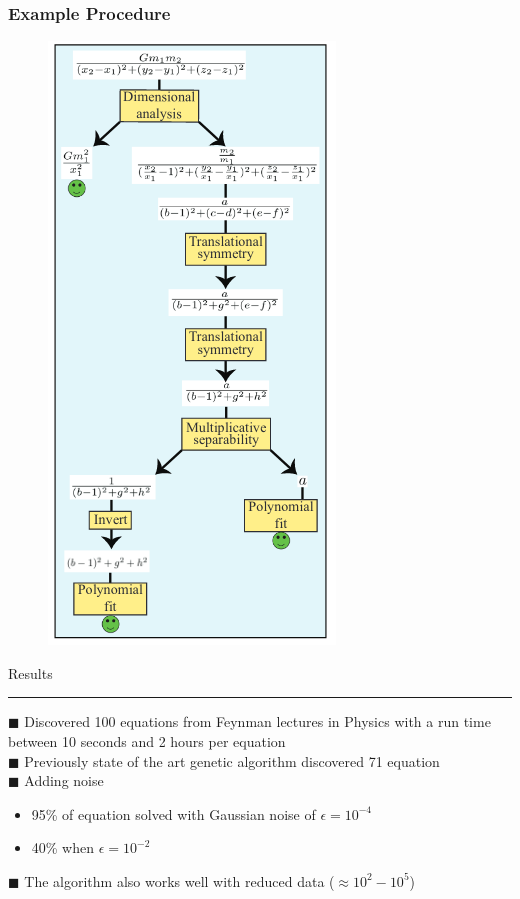 \documentclass[c,compress]{beamer}
\def\bsq{\color{blue(pigment)} $\blacksquare$ \color{black}}
\begin{document}
\begin{frame}\frametitle{Example Procedure}
\label{eg}
\begin{figure}
    \centering
    \includegraphics[height=0.8\textheight,keepaspectratio]{example_scheme.png}
\end{figure}
 

\end{frame}

\begin{frame}{Results\\\rule{10.5cm}{0.5pt}} \label{Method}

\bsq Discovered 100 equations from Feynman lectures in Physics with a run time between 10 seconds and 2 hours per equation\\
\bsq Previously state of the art genetic algorithm discovered 71 equation\\
\bsq Adding noise
\begin{itemize}
    \item 95\% of equation solved with Gaussian noise of $\epsilon = 10^{-4}$
    \item 40\% when $\epsilon = 10^{-2}$
\end{itemize}
\bsq The algorithm also works well with reduced data ($\approx 10^2 - 10^5$)
\end{frame}
\end{document}

